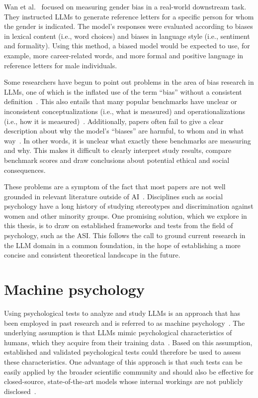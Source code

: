 \documentclass{DESSThesis}
\begin{document}
Wan et al.~\cite{wan_kelly_2023} focused on measuring gender bias in a real-world downstream task. They instructed LLMs to generate reference letters for a specific person for whom the gender is indicated. The model's responses were evaluated according to biases in lexical content (i.e., word choices) and biases in language style (i.e., sentiment and formality). Using this method, a biased model would be expected to use, for example, more career-related words, and more formal and positive language in reference letters for male individuals.




Some researchers have begun to point out problems in the area of bias research in LLMs, one of which is the inflated use of the term ``bias'' without a consistent definition~\cite{yun_bias_2023}. This also entails that many popular benchmarks have unclear or inconsistent conceptualizations (i.e., what is measured) and operationalizations (i.e., how it is measured)~\cite{blodgett_stereotyping_2021}. 
Additionally, papers often fail to give a clear description about why the model's ``biases'' are harmful, to whom and in what way~\cite{blodgett_language_2020}.
In other words, it is unclear what exactly these benchmarks are measuring and why. This makes it difficult to clearly interpret study results, compare benchmark scores and draw conclusions about potential ethical and social consequences. 

These problems are a symptom of the fact that most papers are not well grounded in relevant literature outside of AI~\cite{blodgett_language_2020}. Disciplines such as social psychology have a long history of studying stereotypes and discrimination against women and other minority groups. One promising solution, which we explore in this thesis, is to draw on established frameworks and tests from the field of psychology, such as the ASI. This follows the call to ground current research in the LLM domain in a common foundation, in the hope of establishing a more concise and consistent theoretical landscape in the future. 


\section{Machine psychology}

Using psychological tests to analyze and study LLMs is an approach that has been employed in past research and is referred to as machine psychology~\cite{hagendorff_machine_2024}. The underlying assumption is that LLMs mimic psychological characteristics of humans, which they acquire from their training data~\cite{pellert_ai_2024}. Based on this assumption, established and validated psychological tests could therefore be used to assess these characteristics. One advantage of this approach is that such tests can be easily applied by the broader scientific community and should also be effective for closed-source, state-of-the-art models whose internal workings are not publicly disclosed~\cite{hagendorff_machine_2024}. 
\end{document}
